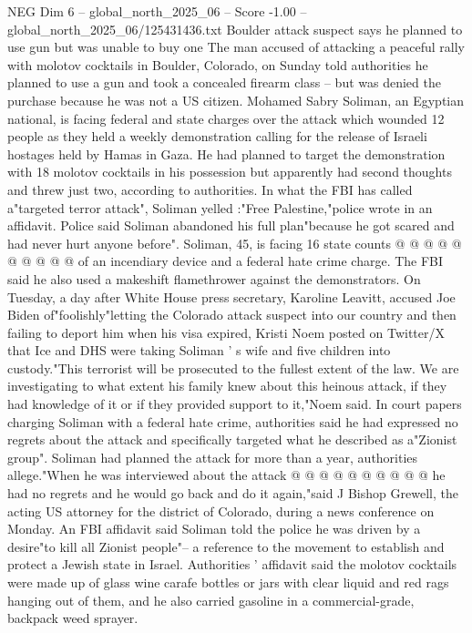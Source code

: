 \begin{textsample}{NEG Dim 6 – global\_north\_2025\_06 – Score -1.00 – global\_north\_2025\_06/125431436.txt}  \label{ex:f6_neg_434}
Boulder attack suspect says he planned to use gun but was unable to buy one The man accused of attacking a peaceful rally with molotov cocktails in Boulder, Colorado, on Sunday told authorities he planned to use a gun and took a concealed firearm class -- but was denied the purchase because he was not a US citizen.
Mohamed Sabry Soliman, an Egyptian national, is facing federal and state charges over the attack which wounded 12 people as they held a weekly demonstration calling for the release of Israeli hostages held by Hamas in Gaza.
He had planned to target the demonstration with 18 molotov cocktails in his possession but apparently had second thoughts and threw just two, according to authorities.
In what the FBI has called a"targeted terror attack", Soliman yelled :"Free Palestine,"police wrote in an affidavit.
Police said Soliman abandoned his full plan"because he got scared and had never hurt anyone before".
Soliman, 45, is facing 16 state counts @ @ @ @ @ @ @ @ @ @ of an incendiary device and a federal hate crime charge.
The FBI said he also used a makeshift flamethrower against the demonstrators.
On Tuesday, a day after White House press secretary, Karoline Leavitt, accused Joe Biden of"foolishly"letting the Colorado attack suspect into our country and then failing to deport him when his visa expired, Kristi Noem posted on Twitter/X that Ice and DHS were taking Soliman ' s wife and five children into custody."This terrorist will be prosecuted to the fullest extent of the law.
We are investigating to what extent his family knew about this heinous attack, if they had knowledge of it or if they provided support to it,"Noem said.
In court papers charging Soliman with a federal hate crime, authorities said he had expressed no regrets about the attack and specifically targeted what he described as a"Zionist group".
Soliman had planned the attack for more than a year, authorities allege."When he was interviewed about the attack @ @ @ @ @ @ @ @ @ @ he had no regrets and he would go back and do it again,"said J Bishop Grewell, the acting US attorney for the district of Colorado, during a news conference on Monday.
An FBI affidavit said Soliman told the police he was driven by a desire"to kill all Zionist people"-- a reference to the movement to establish and protect a Jewish state in Israel.
Authorities ' affidavit said the molotov cocktails were made up of glass wine carafe bottles or jars with clear liquid and red rags hanging out of them, and he also carried gasoline in a commercial-grade, backpack weed sprayer.

\end{textsample}
